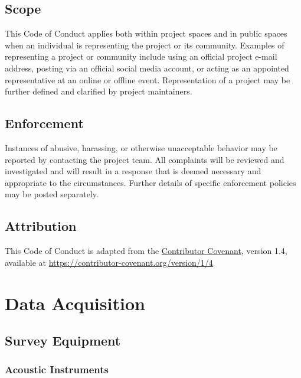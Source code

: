 \documentclass[
  letterpaper,
  oneside,
  open=any]{scrbook}
\begin{document}
\section{Scope}\label{scope}

This Code of Conduct applies both within project spaces and in public
spaces when an individual is representing the project or its community.
Examples of representing a project or community include using an
official project e-mail address, posting via an official social media
account, or acting as an appointed representative at an online or
offline event. Representation of a project may be further defined and
clarified by project maintainers.

\section{Enforcement}\label{enforcement}

Instances of abusive, harassing, or otherwise unacceptable behavior may
be reported by contacting the project team. All complaints will be
reviewed and investigated and will result in a response that is deemed
necessary and appropriate to the circumstances. Further details of
specific enforcement policies may be posted separately.

\section{Attribution}\label{attribution}

This Code of Conduct is adapted from the
\href{https://contributor-covenant.org}{Contributor Covenant}, version
1.4, available at
\href{https://contributor-covenant.org/version/1/4/}{https://contributor-covenant.org/version/1/4}


\chapter{Data Acquisition}\label{data-acquisition}

\section{Survey Equipment}\label{survey-equipment}

\subsection{Acoustic Instruments}\label{acoustic-instruments}
\end{document}
